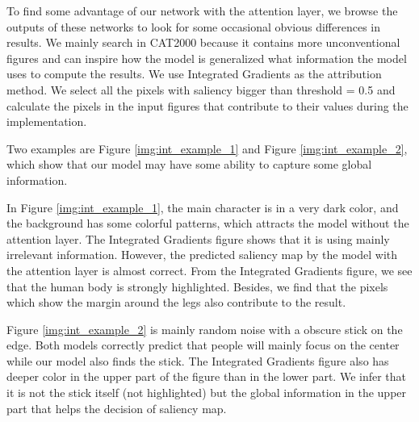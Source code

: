 \documentclass[12pt]{article}
\begin{document}
To find some advantage of our network with the attention layer, we browse the outputs of these networks to look for some occasional obvious differences in results.
We mainly search in CAT2000 because it contains more unconventional figures and can inspire how the model is generalized what information the model uses to compute the results.
We use Integrated Gradients \cite{sundararajan2017axiomatic} as the attribution method. We select all the pixels with saliency bigger than threshold = 0.5 and calculate the pixels in the input figures that contribute to their values during the implementation.

Two examples are Figure \ref{img:int_example_1} and Figure \ref{img:int_example_2}, which show that our model may have some ability to capture some global information.

In Figure \ref{img:int_example_1}, the main character is in a very dark color, and the background has some colorful patterns, which attracts the model without the attention layer. The Integrated Gradients figure shows that it is using mainly irrelevant information.
However, the predicted saliency map by the model with the attention layer is almost correct.
From the Integrated Gradients figure, we see that the human body is strongly highlighted. Besides, we find that the pixels which show the margin around the legs also contribute to the result.

Figure \ref{img:int_example_2} is mainly random noise with a obscure stick on the edge. Both models correctly predict that people will mainly focus on the center while our model also finds the stick.
The Integrated Gradients figure also has deeper color in the upper part of the figure than in the lower part. We infer that it is not the stick itself (not highlighted) but the global information in the upper part that helps the decision of saliency map.
\end{document}
